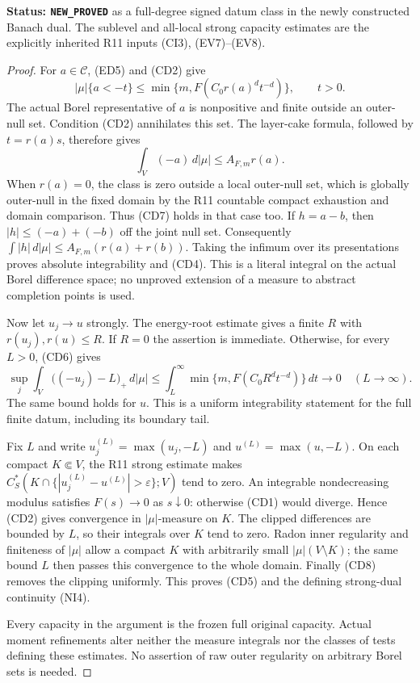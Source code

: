 \documentclass[11pt,a4paper]{article}
\numberwithin{equation}{section}
\theoremstyle{definition}
\theoremstyle{remark}
\begin{document}
\noindent\textbf{Status: \texttt{NEW\_PROVED}} as a
full-degree signed datum class in the newly constructed Banach
dual. The sublevel and all-local strong capacity estimates are
the explicitly inherited R11 inputs (CI3), (EV7)--(EV8).

\begin{proof}
For $a\in\mathscr C$, (ED5) and (CD2) give
\[
       |\mu|\{a<-t\}
       \leq \min\{m,F(C_0r(a)^d t^{-d})\},\qquad t>0.
 \tag{CD6}
\]
The actual Borel representative of $a$ is nonpositive and finite
outside an outer-null set. Condition (CD2) annihilates this set.
The layer-cake formula, followed by $t=r(a)s$, therefore gives
\[
                        \int_V(-a)\,d|\mu|
                                      \leq A_{F,m}r(a).
 \tag{CD7}
\]
When $r(a)=0$, the class is zero outside a local outer-null set,
which is globally outer-null in the fixed domain by the R11
countable compact exhaustion and domain comparison. Thus (CD7)
holds in that case too. If $h=a-b$, then
$|h|\leq(-a)+(-b)$ off the joint null set. Consequently
$\int|h|\,d|\mu|\leq A_{F,m}(r(a)+r(b))$. Taking the infimum
over its presentations proves absolute integrability and (CD4).
This is a literal integral on the actual Borel difference space;
no unproved extension of a measure to abstract completion points
is used.

Now let $u_j\to u$ strongly. The energy-root estimate gives a
finite $R$ with $r(u_j),r(u)\leq R$. If $R=0$ the assertion
is immediate. Otherwise, for every $L>0$, (CD6) gives
\[
 \sup_j\int_V\bigl((-u_j)-L\bigr)_+\,d|\mu|
       \leq\int_L^\infty
                  \min\{m,F(C_0R^d t^{-d})\}\,dt
                   \longrightarrow0\quad(L\to\infty).
 \tag{CD8}
\]
The same bound holds for $u$. This is a uniform integrability
statement for the full finite datum, including its boundary tail.

Fix $L$ and write $u_j^{(L)}=\max(u_j,-L)$ and
$u^{(L)}=\max(u,-L)$. On each compact $K\Subset V$, the
R11 strong estimate makes
$C_S^*(K\cap\{|u_j^{(L)}-u^{(L)}|>\varepsilon\};V)$ tend
to zero. An integrable nondecreasing modulus satisfies
$F(s)\to0$ as $s\downarrow0$: otherwise (CD1) would diverge.
Hence (CD2) gives convergence in $|\mu|$-measure on $K$.
The clipped differences are bounded by $L$, so their integrals
over $K$ tend to zero. Radon inner regularity and finiteness of
$|\mu|$ allow a compact $K$ with arbitrarily small
$|\mu|(V\setminus K)$; the same bound $L$ then passes this
convergence to the whole domain. Finally (CD8) removes the
clipping uniformly. This proves (CD5) and the defining
strong-dual continuity (NI4).

Every capacity in the argument is the frozen full original
capacity. Actual moment refinements alter neither the measure
integrals nor the classes of tests defining these estimates.
No assertion of raw outer regularity on arbitrary Borel sets
is needed.
\end{proof}
\end{document}
